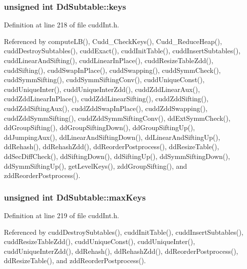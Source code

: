 \subsubsection{\setlength{\rightskip}{0pt plus 5cm}unsigned int \bf{Dd\-Subtable::keys}}\label{structDdSubtable_ca2eea345c00c69090e701ffacff7de4}




Definition at line 218 of file cudd\-Int.h.

Referenced by compute\-LB(), Cudd\_\-Check\-Keys(), Cudd\_\-Reduce\-Heap(), cudd\-Destroy\-Subtables(), cudd\-Exact(), cudd\-Init\-Table(), cudd\-Insert\-Subtables(), cudd\-Linear\-And\-Sifting(), cudd\-Linear\-In\-Place(), cudd\-Resize\-Table\-Zdd(), cudd\-Sifting(), cudd\-Swap\-In\-Place(), cudd\-Swapping(), cudd\-Symm\-Check(), cudd\-Symm\-Sifting(), cudd\-Symm\-Sifting\-Conv(), cudd\-Unique\-Const(), cudd\-Unique\-Inter(), cudd\-Unique\-Inter\-Zdd(), cudd\-Zdd\-Linear\-Aux(), cudd\-Zdd\-Linear\-In\-Place(), cudd\-Zdd\-Linear\-Sifting(), cudd\-Zdd\-Sifting(), cudd\-Zdd\-Sifting\-Aux(), cudd\-Zdd\-Swap\-In\-Place(), cudd\-Zdd\-Swapping(), cudd\-Zdd\-Symm\-Sifting(), cudd\-Zdd\-Symm\-Sifting\-Conv(), dd\-Ext\-Symm\-Check(), dd\-Group\-Sifting(), dd\-Group\-Sifting\-Down(), dd\-Group\-Sifting\-Up(), dd\-Jumping\-Aux(), dd\-Linear\-And\-Sifting\-Down(), dd\-Linear\-And\-Sifting\-Up(), dd\-Rehash(), dd\-Rehash\-Zdd(), dd\-Reorder\-Postprocess(), dd\-Resize\-Table(), dd\-Sec\-Diff\-Check(), dd\-Sifting\-Down(), dd\-Sifting\-Up(), dd\-Symm\-Sifting\-Down(), dd\-Symm\-Sifting\-Up(), get\-Level\-Keys(), zdd\-Group\-Sifting(), and zdd\-Reorder\-Postprocess().
\subsubsection{\setlength{\rightskip}{0pt plus 5cm}unsigned int \bf{Dd\-Subtable::max\-Keys}}\label{structDdSubtable_2997673187c40bc7d7977a2581581420}




Definition at line 219 of file cudd\-Int.h.

Referenced by cudd\-Destroy\-Subtables(), cudd\-Init\-Table(), cudd\-Insert\-Subtables(), cudd\-Resize\-Table\-Zdd(), cudd\-Unique\-Const(), cudd\-Unique\-Inter(), cudd\-Unique\-Inter\-Zdd(), dd\-Rehash(), dd\-Rehash\-Zdd(), dd\-Reorder\-Postprocess(), dd\-Resize\-Table(), and zdd\-Reorder\-Postprocess().
